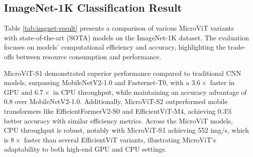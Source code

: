 \subsection{ImageNet-1K Classification Result}
Table \ref{tab:imgnet-result} presents a comparison of various MicroViT variants with state-of-the-art (SOTA) models on the ImageNet-1K dataset. The evaluation focuses on models' computational efficiency and accuracy, highlighting the trade-offs between resource consumption and performance. 

MicroViT-S1 demonstrated superior performance compared to traditional CNN models, surpassing MobileNetV2-1.0\cite{sandler2018mobilenetv2} and Fasternet-T0\cite{mehta2022separable}, with a $3.6 \times$ faster in GPU and $6.7 \times$ in CPU throughput, while maintaining an accuracy advantage of 0.8 over MobileNetV2-1.0. Additionally, MicroViT-S2 outperformed mobile transformers like EfficientFormerV2-S0\cite{li2023rethinking} and EfficientViT-M4\cite{liu2023efficientvit}, achieving $0.3\%$ better accuracy with similar efficiency metrics. Across the MicroViT models, CPU throughput is robust, notably with MicroViT-S1 achieving 552 img/s, which is $8 \times$ faster than several EfficientViT variants, illustrating MicroViT's adaptability to both high-end GPU and CPU settings.


